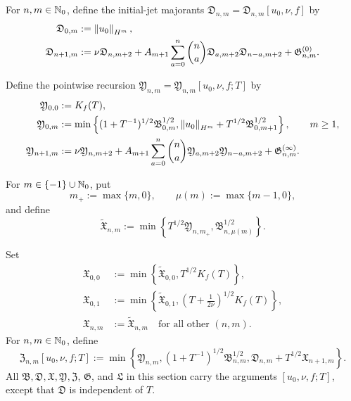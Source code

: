 \begin{definition}
For \(n,m\in\mathbb N_0\), define the initial-jet majorants
\(\mathfrak D_{n,m}=\mathfrak D_{n,m}[u_0,\nu,f]\) by
\begin{align}
 \mathfrak D_{0,m}&:=\left\lVert u_0\right\rVert_{H^m},
 \label{eq:qc-D0}\\
 \mathfrak D_{n+1,m}
 &:=\nu\mathfrak D_{n,m+2}
 +A_{m+1}\sum_{a=0}^{n}\binom na
   \mathfrak D_{a,m+2}\mathfrak D_{n-a,m+2}
  +\mathfrak G^{(0)}_{n,m}.
 \label{eq:qc-Drec}
\end{align}
\begin{samepage}
Define the pointwise recursion
\(\mathfrak Y_{n,m}=\mathfrak Y_{n,m}[u_0,\nu,f;T]\) by
\begin{align}
 \mathfrak Y_{0,0}&:=K_f(T),
 \label{eq:qc-Y00}\\
 \mathfrak Y_{0,m}
 &:=\min\left\{
 (1+T^{-1})^{1/2}\mathfrak B_{0,m}^{1/2},
 \left\lVert u_0\right\rVert_{H^m}+T^{1/2}\mathfrak B_{0,m+1}^{1/2}
 \right\},
 \qquad m\ge1,
 \label{eq:qc-Y0}\\
 \mathfrak Y_{n+1,m}
 &:=\nu\mathfrak Y_{n,m+2}
 +A_{m+1}\sum_{a=0}^{n}\binom na
 \mathfrak Y_{a,m+2}\mathfrak Y_{n-a,m+2}
 +\mathfrak G^{(\infty)}_{n,m}.
 \label{eq:qc-Yrec}
\end{align}
\end{samepage}
\begin{samepage}
For \(m\in\{-1\}\cup\mathbb N_0\), put
\[
 m_+:=\max\{m,0\},
 \qquad
 \mu(m):=\max\{m-1,0\},
\]
and define
\begin{equation}
 \widetilde{\mathfrak X}_{n,m}
 :=\min\left\{
 T^{1/2}\mathfrak Y_{n,m_+},
 \mathfrak B_{n,\mu(m)}^{1/2}
 \right\}.
 \label{eq:qc-Xraw}
\end{equation}
\end{samepage}
Set
\begin{align}
 \mathfrak X_{0,0}
 &:=\min\left\{\widetilde{\mathfrak X}_{0,0},
 T^{1/2}K_f(T)\right\},
 \label{eq:qc-X00}\\
 \mathfrak X_{0,1}
 &:=\min\left\{\widetilde{\mathfrak X}_{0,1},
 \left(T+\frac1{2\nu}\right)^{1/2}K_f(T)\right\},
 \label{eq:qc-X01}\\
 \mathfrak X_{n,m}&:=\widetilde{\mathfrak X}_{n,m}
 \quad\text{for all other }(n,m).
 \label{eq:qc-Xotherwise}
\end{align}
For \(n,m\in\mathbb N_0\), define
\begin{equation}
 \mathfrak Z_{n,m}[u_0,\nu,f;T]
 :=\min\left\{
 \mathfrak Y_{n,m},
 (1+T^{-1})^{1/2}\mathfrak B_{n,m}^{1/2},
 \mathfrak D_{n,m}+T^{1/2}\mathfrak X_{n+1,m}
 \right\}.
 \label{eq:qc-Z}
\end{equation}
All \(\mathfrak B,\mathfrak D,\mathfrak X,\mathfrak Y,\mathfrak Z\),
\(\mathfrak G\), and \(\mathfrak L\) in
this section carry the arguments \([u_0,\nu,f;T]\), except that
\(\mathfrak D\) is independent of \(T\).
\end{definition}

